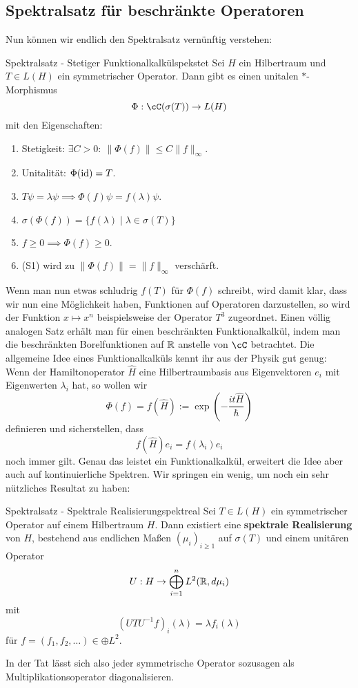 \subsection{Spektralsatz für beschränkte Operatoren}

Nun können wir endlich den Spektralsatz vernünftig verstehen:
\begin{theorem}{Spektralsatz - Stetiger Funktionalkalkül}{spekstet}
Sei $H$ ein Hilbertraum und $T \in L(H)$ ein symmetrischer Operator. Dann gibt es einen unitalen $\ast$-Morphismus
\[ \Phi: \cC(\sigma(T)) \to L(H) \] mit den Eigenschaften:
\begin{enumerate}[({S}1)]
\item Stetigkeit: $\exists C > 0: \ \| \Phi(f)\| \leq C \|f\|_\infty$.
\item Unitalität: $\Phi(\text{id})=T$.
\item $T \psi = \lambda \psi \implies \Phi(f) \psi = f(\lambda) \psi$. 
\item $\sigma(\Phi(f)) = \{f(\lambda) \mid \lambda \in \sigma(T) \}$
\item $f \geq 0 \implies \Phi(f) \geq 0$.
\item (S1) wird zu $\| \Phi(f) \| = \| f\|_\infty$ verschärft.
\end{enumerate}
\end{theorem}
Wenn man nun etwas schludrig $f(T)$ für $\Phi(f)$ schreibt, wird damit klar, dass wir nun eine Möglichkeit haben, Funktionen auf Operatoren darzustellen, so wird der Funktion $x \mapsto x^n$ beispielsweise der Operator $T^3$ zugeordnet. Einen völlig analogen Satz erhält man für einen beschränkten Funktionalkalkül, indem man die beschränkten Borelfunktionen auf $\mathbb{R}$ anstelle von $\cC$ betrachtet. Die allgemeine Idee eines Funktionalkalküls kennt ihr aus der Physik gut genug: Wenn der Hamiltonoperator $\widehat{H}$ eine Hilbertraumbasis aus Eigenvektoren $e_i$ mit Eigenwerten $\lambda_i$ hat, so wollen wir \[\Phi(f) = f(\widehat{H}) := \exp(-\frac{it\widehat{H}}{\hbar})\] definieren und sicherstellen, dass
\[ f(\widehat{H})e_i = f(\lambda_i) e_i \] noch immer gilt. Genau das leistet ein Funktionalkalkül, erweitert die Idee aber auch auf kontinuierliche Spektren. Wir springen ein wenig, um noch ein sehr nützliches Resultat zu haben:
\begin{theorem}{Spektralsatz - Spektrale Realisierung}{spektreal}
Sei $T \in L(H)$ ein symmetrischer Operator auf einem Hilbertraum $H$. Dann existiert eine \textbf{spektrale Realisierung} von $H$, bestehend aus endlichen Maßen $(\mu_i)_{i \geq 1}$ auf $\sigma(T)$ und einem unitären Operator
\[ U: H \to \bigoplus_{i=1}^n L^2(\mathbb{R}, d\mu_i) \] mit 
\[ (UTU^{-1} f)_i (\lambda) = \lambda f_i(\lambda) \] für $f = (f_1, f_2, \dots) \in \oplus L^2$.
\end{theorem}
In der Tat lässt sich also jeder symmetrische Operator sozusagen als Multiplikationsoperator diagonalisieren.